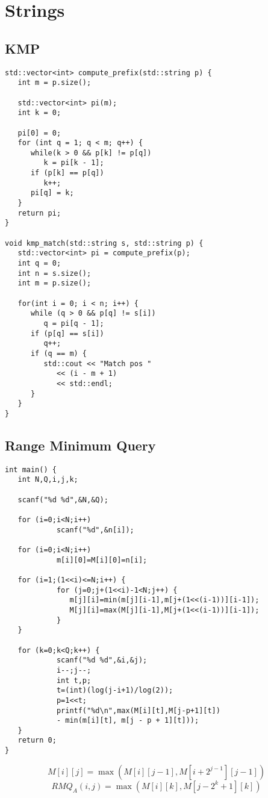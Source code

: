 \section{Strings}

\subsection{KMP}
\begin{verbatim}
std::vector<int> compute_prefix(std::string p) {
   int m = p.size();

   std::vector<int> pi(m);
   int k = 0;

   pi[0] = 0;
   for (int q = 1; q < m; q++) {
      while(k > 0 && p[k] != p[q])
         k = pi[k - 1];
      if (p[k] == p[q])
         k++;
      pi[q] = k;
   }
   return pi;
}

void kmp_match(std::string s, std::string p) {
   std::vector<int> pi = compute_prefix(p);
   int q = 0;
   int n = s.size();
   int m = p.size();

   for(int i = 0; i < n; i++) {
      while (q > 0 && p[q] != s[i])
         q = pi[q - 1];
      if (p[q] == s[i])
         q++;
      if (q == m) {
         std::cout << "Match pos "
            << (i - m + 1)
            << std::endl;
      }
   }
}
\end{verbatim}

\subsection{Range Minimum Query}
\begin{verbatim}
int main() {
   int N,Q,i,j,k;

   scanf("%d %d",&N,&Q);

   for (i=0;i<N;i++)
            scanf("%d",&n[i]);

   for (i=0;i<N;i++)
            m[i][0]=M[i][0]=n[i];

   for (i=1;(1<<i)<=N;i++) {
            for (j=0;j+(1<<i)-1<N;j++) {
               m[j][i]=min(m[j][i-1],m[j+(1<<(i-1))][i-1]);
               M[j][i]=max(M[j][i-1],M[j+(1<<(i-1))][i-1]);
            }
   }

   for (k=0;k<Q;k++) {
            scanf("%d %d",&i,&j);
            i--;j--;
            int t,p;
            t=(int)(log(j-i+1)/log(2));
            p=1<<t;
            printf("%d\n",max(M[i][t],M[j-p+1][t])
            - min(m[i][t], m[j - p + 1][t]));
   }
   return 0;
}
\end{verbatim}
$$
M[i][j]=\max(M[i][j-1],M[i+2^{j-1}][j-1])
$$
$$
RMQ_A(i,j)=\max(M[i][k],M[j-2^k+1][k])
$$

